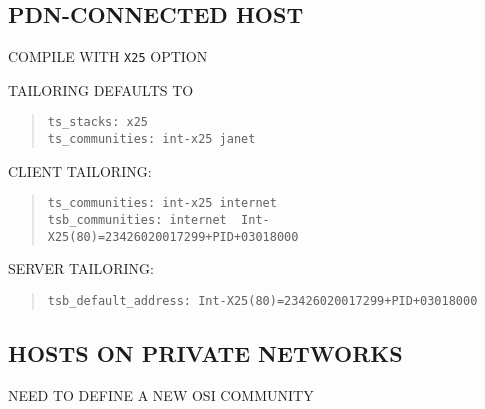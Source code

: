 \begin{bwslide}
\part*	{PDN-CONNECTED HOST}\bf

\begin{nrtc}
\item	COMPILE WITH \verb"X25" OPTION

\item	TAILORING DEFAULTS TO
\begin{quote}\small\begin{verbatim}
ts_stacks: x25
ts_communities: int-x25 janet
\end{verbatim}\end{quote}
\end{nrtc}
\end{bwslide}


\begin{bwslide}

\begin{nrtc}
\item	CLIENT TAILORING:
\begin{quote}\small\begin{verbatim}
ts_communities: int-x25 internet
tsb_communities: internet  Int-X25(80)=23426020017299+PID+03018000
\end{verbatim}\end{quote}

\item	SERVER TAILORING:
\begin{quote}\small\begin{verbatim}
tsb_default_address: Int-X25(80)=23426020017299+PID+03018000
\end{verbatim}\end{quote}
\end{nrtc}
\end{bwslide}



\begin{bwslide}
\part*	{HOSTS ON PRIVATE NETWORKS}\bf

\begin{nrtc}
\item	NEED TO DEFINE A NEW OSI COMMUNITY
\end{nrtc}
\end{bwslide}


